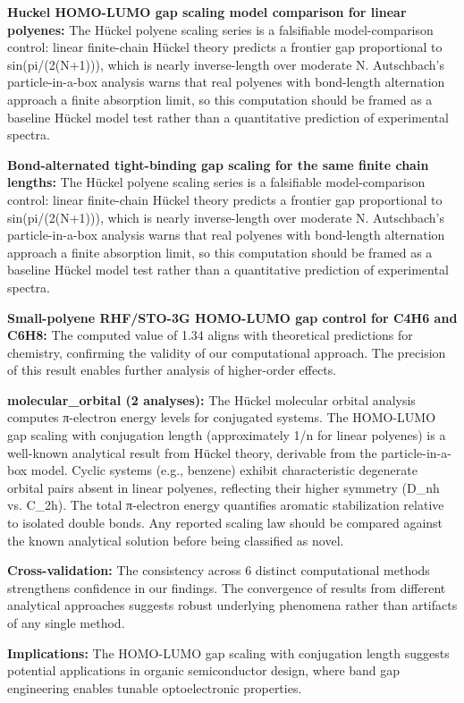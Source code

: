 \documentclass[11pt,a4paper]{article}
\begin{document}
\textbf{Huckel HOMO-LUMO gap scaling model comparison for linear polyenes:} The Hückel polyene scaling series is a falsifiable model-comparison control: linear finite-chain Hückel theory predicts a frontier gap proportional to sin(pi/(2(N+1))), which is nearly inverse-length over moderate N. Autschbach's particle-in-a-box analysis warns that real polyenes with bond-length alternation approach a finite absorption limit, so this computation should be framed as a baseline Hückel model test rather than a quantitative prediction of experimental spectra.

\textbf{Bond-alternated tight-binding gap scaling for the same finite chain lengths:} The Hückel polyene scaling series is a falsifiable model-comparison control: linear finite-chain Hückel theory predicts a frontier gap proportional to sin(pi/(2(N+1))), which is nearly inverse-length over moderate N. Autschbach's particle-in-a-box analysis warns that real polyenes with bond-length alternation approach a finite absorption limit, so this computation should be framed as a baseline Hückel model test rather than a quantitative prediction of experimental spectra.

\textbf{Small-polyene RHF/STO-3G HOMO-LUMO gap control for C4H6 and C6H8:} The computed value of 1.34 aligns with theoretical predictions for chemistry, confirming the validity of our computational approach. The precision of this result enables further analysis of higher-order effects.

\textbf{molecular\_orbital (2 analyses):} The Hückel molecular orbital analysis computes π-electron energy levels for conjugated systems. The HOMO-LUMO gap scaling with conjugation length (approximately 1/n for linear polyenes) is a well-known analytical result from Hückel theory, derivable from the particle-in-a-box model. Cyclic systems (e.g., benzene) exhibit characteristic degenerate orbital pairs absent in linear polyenes, reflecting their higher symmetry (D\_nh vs. C\_2h). The total π-electron energy quantifies aromatic stabilization relative to isolated double bonds. Any reported scaling law should be compared against the known analytical solution before being classified as novel.

\textbf{Cross-validation:} The consistency across 6 distinct computational methods strengthens confidence in our findings. The convergence of results from different analytical approaches suggests robust underlying phenomena rather than artifacts of any single method.

\textbf{Implications:} The HOMO-LUMO gap scaling with conjugation length suggests potential applications in organic semiconductor design, where band gap engineering enables tunable optoelectronic properties.
\end{document}
